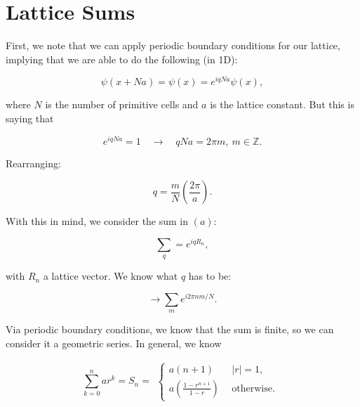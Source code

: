 \section{Lattice Sums}

\begin{parts}

\item First, we note that we can apply periodic boundary conditions for our lattice, implying that we are able to do the following (in 1D):

  \begin{equation}
    \psi(x + Na) = \psi(x) = e^{iqNa}\psi(x),
  \end{equation}

  where $N$ is the number of primitive cells and $a$ is the lattice constant. But this is saying that

  \begin{equation}
    e^{iqNa} = 1 \quad\rightarrow\quad qNa = 2\pi m,\ m \in \mathbb{Z}.
  \end{equation}

  Rearranging:

  \begin{equation}
    q = \frac{m}{N}\left( \frac{2\pi}{a} \right).
  \end{equation}

  With this in mind, we consider the sum in $(a)$:

  \begin{equation}
    \sum_{q} = e^{iqR_n},
  \end{equation}

  with $R_n$ a lattice vector. We know what $q$ has to be:

  \begin{equation}
    \rightarrow \sum_m e^{i2\pi nm/N}.
  \end{equation}

  Via periodic boundary conditions, we know that the sum is finite, so we can consider it a geometric series. In general, we know 

  \begin{equation}
    \sum_{k=0}^n ar^k = S_n =
    \begin{alignedat}{1}
    \begin{cases}
      a(n+1) \quad & |r|=1\label{eq:3-2-1}, \\
      a\left( \frac{1 - r^{n+1}}{1-r} \right) & \text{otherwise}.
    \end{cases}
    \end{alignedat}
  \end{equation}


\end{parts}
